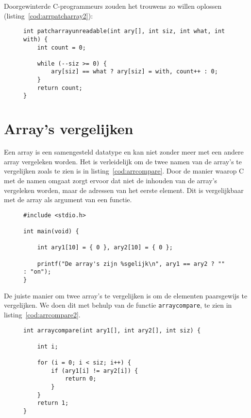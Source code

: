 Doorgewinterde C-programmeurs zouden het trouwens zo willen oplossen (listing~\ref{cod:arrpatcharray2}):

\begin{figure}[!ht]
\begin{lstlisting}[caption=Functie om een getal te vervangen door een ander getal (onleesbaar).,label=cod:arrpatcharray2]
int patcharrayunreadable(int ary[], int siz, int what, int with) {
    int count = 0;

    while (--siz >= 0) {
        ary[siz] == what ? ary[siz] = with, count++ : 0;
    }
    return count;
}
\end{lstlisting}
\end{figure}


\section{Array's vergelijken}
Een array is een samengesteld datatype en kan niet zonder meer met een andere array vergeleken worden. Het is verleidelijk om de twee namen van de array's te vergelijken zoals te zien is in listing~\ref{cod:arrcompare}. Door de manier waarop C met de namen omgaat zorgt ervoor dat niet de inhouden van de array's vergeleken worden, maar de adressen van het eerste element. Dit is vergelijkbaar met de array als argument van een functie.

\begin{figure}[!ht]
\begin{lstlisting}[caption=Vergelijken van twee array's (foutief).,label=cod:arrcompare]
#include <stdio.h>

int main(void) {

	int ary1[10] = { 0 }, ary2[10] = { 0 };

	printf("De array's zijn %sgelijk\n", ary1 == ary2 ? "" : "on");
}
\end{lstlisting}
\end{figure}

De juiste manier om twee array's te vergelijken is om de elementen paarsgewijs te vergelijken. We doen dit met behulp van de functie \texttt{arraycompare}, te zien in listing~\ref{cod:arrcompare2}.

\begin{figure}[H]
\begin{lstlisting}[caption=Vergelijken van twee array's.,label=cod:arrcompare2]
int arraycompare(int ary1[], int ary2[], int siz) {

	int i;

	for (i = 0; i < siz; i++) {
		if (ary1[i] != ary2[i]) {
			return 0;
		}
	}
	return 1;
}
\end{lstlisting}
\end{figure}

